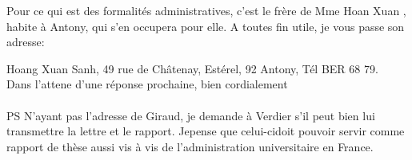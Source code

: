 Pour ce qui est des formalités administratives, c'est le frère de Mme Hoan Xuan ,  habite à Antony, qui s'en occupera pour elle. A toutes fin utile, je vous passe son adresse:

Hoang Xuan Sanh, 49 rue de Châtenay, Estérel, 92 Antony, Tél BER 68 79.\\

Dans l'attene d'une réponse prochaine, bien cordialement\\
\hfill{}\\

PS N'ayant pas l'adresse de Giraud, je demande à Verdier s'il peut bien lui transmettre la lettre et le rapport. Je\unsure{,}pense que celui-ci\unsure{\_}doit pouvoi\rlap{\raisebox{-1.1ex}[0pt][0pt]{\hspace{.2em}\unsure{(}}}r servir comme rapport de thèse aussi vis à vis de l'administration universitaire en France.
